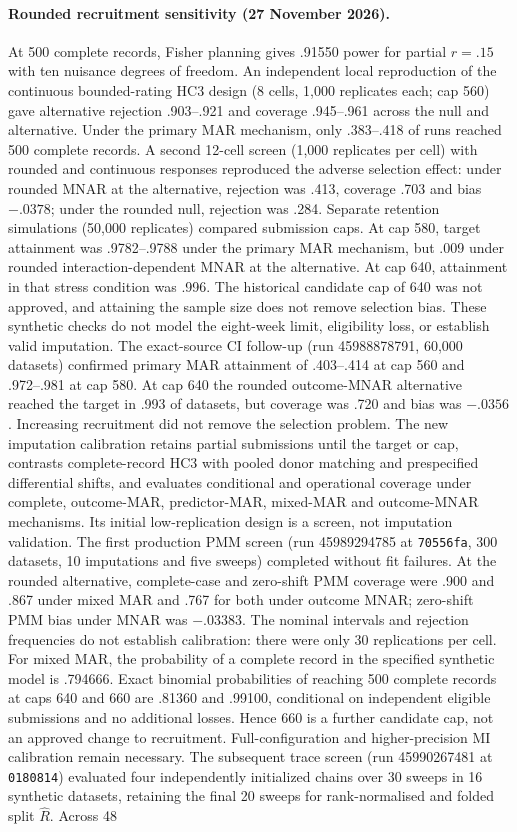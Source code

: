 \documentclass[11pt,a4paper]{article}
\begin{document}
\paragraph{Rounded recruitment sensitivity (27 November 2026).}
At 500 complete records, Fisher planning gives .91550 power for partial $r=.15$ with ten nuisance degrees of freedom. An independent local reproduction of the continuous bounded-rating HC3 design (8 cells, 1,000 replicates each; cap 560) gave alternative rejection .903--.921 and coverage .945--.961 across the null and alternative. Under the primary MAR mechanism, only .383--.418 of runs reached 500 complete records. A second 12-cell screen (1,000 replicates per cell) with rounded and continuous responses reproduced the adverse selection effect: under rounded MNAR at the alternative, rejection was .413, coverage .703 and bias $-.0378$; under the rounded null, rejection was .284. Separate retention simulations (50,000 replicates) compared submission caps. At cap 580, target attainment was .9782--.9788 under the primary MAR mechanism, but .009 under rounded interaction-dependent MNAR at the alternative. At cap 640, attainment in that stress condition was .996. The historical candidate cap of 640 was not approved, and attaining the sample size does not remove selection bias. These synthetic checks do not model the eight-week limit, eligibility loss, or establish valid imputation. The exact-source CI follow-up (run 45988878791, 60,000 datasets) confirmed primary MAR attainment of .403--.414 at cap 560 and .972--.981 at cap 580. At cap 640 the rounded outcome-MNAR alternative reached the target in .993 of datasets, but coverage was .720 and bias was $-.0356$. Increasing recruitment did not remove the selection problem. The new imputation calibration retains partial submissions until the target or cap, contrasts complete-record HC3 with pooled donor matching and prespecified differential shifts, and evaluates conditional and operational coverage under complete, outcome-MAR, predictor-MAR, mixed-MAR and outcome-MNAR mechanisms. Its initial low-replication design is a screen, not imputation validation. The first production PMM screen (run 45989294785 at \texttt{70556fa}, 300 datasets, 10 imputations and five sweeps) completed without fit failures. At the rounded alternative, complete-case and zero-shift PMM coverage were .900 and .867 under mixed MAR and .767 for both under outcome MNAR; zero-shift PMM bias under MNAR was $-.03383$. The nominal intervals and rejection frequencies do not establish calibration: there were only 30 replications per cell. For mixed MAR, the probability of a complete record in the specified synthetic model is .794666. Exact binomial probabilities of reaching 500 complete records at caps 640 and 660 are .81360 and .99100, conditional on independent eligible submissions and no additional losses. Hence 660 is a further candidate cap, not an approved change to recruitment. Full-configuration and higher-precision MI calibration remain necessary. The subsequent trace screen (run 45990267481 at \texttt{0180814}) evaluated four independently initialized chains over 30 sweeps in 16 synthetic datasets, retaining the final 20 sweeps for rank-normalised and folded split $\widehat R$. Across 48 
\end{document}

